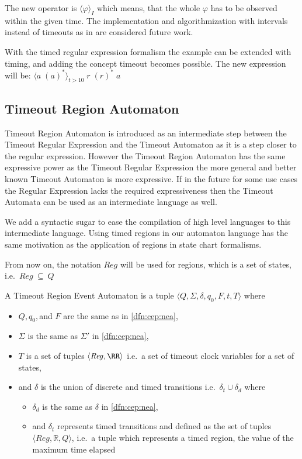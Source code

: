 	
			The new operator is $\langle \varphi \rangle_I$ which means, that the whole $\varphi$ has to be observed within the given time.	
			The implementation and algorithmization with intervals instead of timeouts as in \citep{tre} are considered future work.
	
			With the timed regular expression formalism the example can be extended with timing, and adding the concept timeout becomes possible.
			The new expression will be: $ \langle a \; (a)^\ast \rangle_{t > 10} \; r \; (r)^\ast \; a$
			
			\subsection{Timeout Region Automaton}
			
			Timeout Region Automaton is introduced as an intermediate step between the Timeout Regular Expression and the Timeout Automaton as it is a step closer to the regular expression.
			However the Timeout Region Automaton has the same expressive power as the Timeout Regular Expression the more general and better known Timeout Automaton is more expressive.
			If in the future for some use cases the Regular Expression lacks the required expressiveness then the Timeout Automata can be used as an intermediate language as well.
			
			We add a syntactic sugar to ease the compilation of high level languages to this intermediate language.
			Using timed regions in our automaton language has the same motivation as the application of regions in state chart formalisms.
			
			From now on, the notation $\mathit{Reg}$ will be used for regions, which is a set of states, i.e.~$\mathit{Reg}~\subseteq~Q$
			
			
			\begin{dfn}
				\label{dfn:cep:trea}
				A Timeout Region Event Automaton is a tuple $\langle Q,\Sigma,\delta,q_0, F, t, T \rangle$ where
				\begin{itemize}
					\item $Q, q_0,$and $F$ are the same as in \cref{dfn:cep:nea},
					\item $\Sigma$ is the same as $\Sigma'$ in \cref{dfn:cep:nea}, 
					
					\item $T$ is a set of tuples $\langle \mathit{Reg}, \RR \rangle$ i.e.~a set of timeout clock variables for a set of states,
					\item and $\delta$ is the union of discrete and timed transitions i.e.~$\delta_t \cup \delta_d$ where
					\begin{itemize}
						\item $\delta_d$ is the same as $\delta$ in \cref{dfn:cep:nea},
						\item and $\delta_t$ represents timed transitions and defined as the set of tuples $\langle \mathit{Reg} , \mathbb{R} , Q \rangle$, i.e.~a tuple which represents a timed region, the value of the maximum time elapsed
					\end{itemize}
					
				\end{itemize}
			\end{dfn}
			
